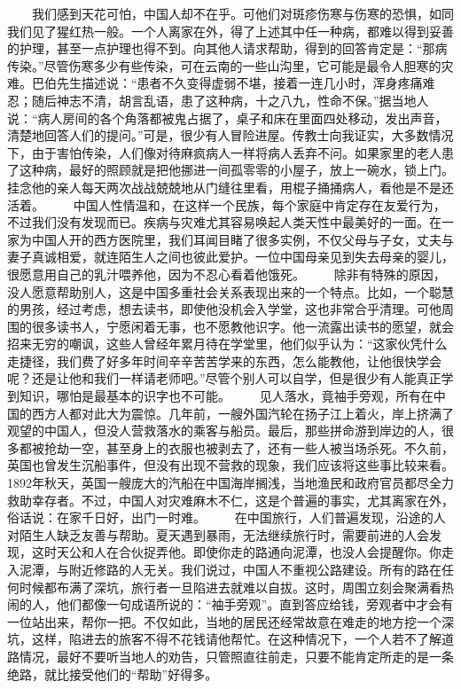 \documentclass[12pt,oneside]{book}
\begin{document}
\begin{common-format}
　　我们感到天花可怕，中国人却不在乎。可他们对斑疹伤寒与伤寒的恐惧，如同我们见了猩红热一般。一个人离家在外，得了上述其中任一种病，都难以得到妥善的护理，甚至一点护理也得不到。向其他人请求帮助，得到的回答肯定是：“那病传染。”尽管伤寒多少有些传染，可在云南的一些山沟里，它可能是最令人胆寒的灾难。巴伯先生描述说：“患者不久变得虚弱不堪，接着一连几小时，浑身疼痛难忍；随后神志不清，胡言乱语，患了这种病，十之八九，性命不保。”据当地人说：“病人房间的各个角落都被鬼占据了，桌子和床在里面四处移动，发出声音，清楚地回答人们的提问。”可是，很少有人冒险进屋。传教士向我证实，大多数情况下，由于害怕传染，人们像对待麻疯病人一样将病人丢弃不问。如果家里的老人患了这种病，最好的照顾就是把他挪进一间孤零零的小屋子，放上一碗水，锁上门。挂念他的亲人每天两次战战兢兢地从门缝往里看，用棍子捅捅病人，看他是不是还活着。 
　　中国人性情温和，在这样一个民族，每个家庭中肯定存在友爱行为，不过我们没有发现而已。疾病与灾难尤其容易唤起人类天性中最美好的一面。在一家为中国人开的西方医院里，我们耳闻目睹了很多实例，不仅父母与子女，丈夫与妻子真诚相爱，就连陌生人之间也彼此爱护。一位中国母亲见到失去母亲的婴儿，很愿意用自己的乳汁喂养他，因为不忍心看着他饿死。 
　　除非有特殊的原因，没人愿意帮助别人，这是中国多重社会关系表现出来的一个特点。比如，一个聪慧的男孩，经过考虑，想去读书，即使他没机会入学堂，这也非常合乎清理。可他周围的很多读书人，宁愿闲着无事，也不愿教他识字。他一流露出读书的愿望，就会招来无穷的嘲讽，这些人曾经年累月待在学堂里，他们似乎认为：“这家伙凭什么走捷径，我们费了好多年时间辛辛苦苦学来的东西，怎么能教他，让他很快学会呢？还是让他和我们一样请老师吧。”尽管个别人可以自学，但是很少有人能真正学到知识，哪怕是最基本的识字也不可能。 
　　见人落水，竟袖手旁观，所有在中国的西方人都对此大为震惊。几年前，一艘外国汽轮在扬子江上着火，岸上挤满了观望的中国人，但没人营救落水的乘客与船员。最后，那些拼命游到岸边的人，很多都被抢劫一空，甚至身上的衣服也被剥去了，还有一些人被当场杀死。不久前，英国也曾发生沉船事件，但没有出现不营救的现象，我们应该将这些事比较来看。1892年秋天，英国一艘庞大的汽船在中国海岸搁浅，当地渔民和政府官员都尽全力救助幸存者。不过，中国人对灾难麻木不仁，这是个普遍的事实，尤其离家在外，俗话说：在家千日好，出门一时难。 
　　在中国旅行，人们普遍发现，沿途的人对陌生人缺乏友善与帮助。夏天遇到暴雨，无法继续旅行时，需要前进的人会发现，这时天公和人在合伙捉弄他。即使你走的路通向泥潭，也没人会提醒你。你走入泥潭，与附近修路的人无关。我们说过，中国人不重视公路建设。所有的路在任何时候都布满了深坑，旅行者一旦陷进去就难以自拔。这时，周围立刻会聚满看热闹的人，他们都像一句成语所说的：“袖手旁观”。直到答应给钱，旁观者中才会有一位站出来，帮你一把。不仅如此，当地的居民还经常故意在难走的地方挖一个深坑，这样，陷进去的旅客不得不花钱请他帮忙。在这种情况下，一个人若不了解道路情况，最好不要听当地人的劝告，只管照直往前走，只要不能肯定所走的是一条绝路，就比接受他们的“帮助”好得多。 

\end{common-format}
\end{document}
